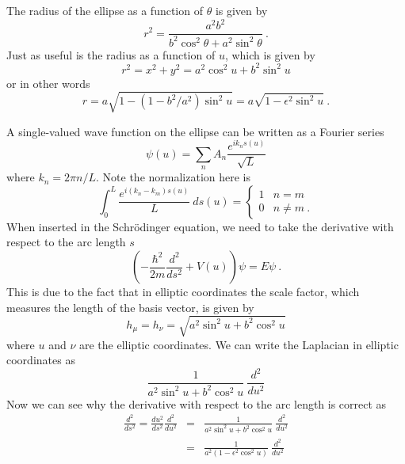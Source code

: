 \documentclass[aps,pra,showpacs,twocolumn]{revtex4}
\begin{document}
The radius of the ellipse as a function of $\theta$ is given by 
\begin{equation}
r^2=\frac{a^2 b^2}{b^2 \cos^{2} \theta + a^2 \sin^{2} \theta} \ .
\end{equation}
Just as useful is the radius as a function of $u$, which is given by
\begin{equation}
r^2=x^2+y^2=a^2 \cos^2 u + b^2 \sin^2 u
\end{equation}
or in other words
\begin{equation}
r=a\sqrt{1-(1-b^2/a^2) \sin^2 u}=a \sqrt{1-\epsilon^2 \sin^2 u} \ .
\end{equation}

A single-valued wave function on the ellipse can be written as a Fourier series
\begin{equation}
\psi(u)= \sum_{n} A_{n} \frac{e^{i k_{n} s(u)}}{\sqrt{L}} 
\label{eq:wf}
\end{equation}
where $k_{n}= 2 \pi n / L$.  Note the normalization here is
\begin{equation}
\int_0^L\frac{e^{i (k_{n}-k_{m}) s(u)}}{L}\:ds(u)=\begin{cases}
1 & n=m\\
0 & n\ne m \ . \end{cases}
\end{equation}
 When inserted in the Schr\"{o}dinger equation, we need to take the derivative with respect to the arc length $s$
\begin{equation}
\left(-\frac{\hbar^2}{2m} \frac{d^2}{d s^2} +V(u)\right) \psi = E \psi \ .
\end{equation}
This is due to the fact that in elliptic coordinates the scale factor, which measures the length of the basis vector, is given by
\begin{equation}
h_{\mu}=h_{\nu}=\sqrt{a^2 \mathrm{\sin^{2}} u + b^2 \mathrm{\cos^{2}} u}
\end{equation}
where $u$ and $\nu$ are the elliptic coordinates. We can write the Laplacian in elliptic coordinates as
\begin{equation}
\frac{1}{a^2 \mathrm{\sin^{2}} u + b^2 \mathrm{\cos^{2}} u}\:\frac{d^2}{d u^2}
\end{equation}
Now we can see why the derivative with respect to the arc length is correct as
\begin{eqnarray}
\frac{d^2}{d s^2}=\frac{d u^2}{d s^2}\frac{d^2 }{d u^2}&=&\frac{1}{a^2 \mathrm{\sin^{2}} u + b^2 \mathrm{\cos^{2}} u}\:\frac{d^2 }{d u^2} \nonumber \\
&=&\frac{1}{a^2 \left(1- \epsilon^2\mathrm{\cos^{2}} u\right)}\:\frac{d^2 }{d u^2}
\end{eqnarray}
\end{document}
